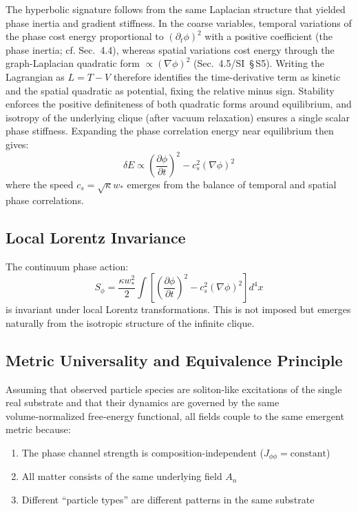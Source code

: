 \documentclass[11pt]{article}
\begin{document}
The hyperbolic signature follows from the same Laplacian structure that yielded phase inertia and gradient stiffness. In the coarse variables, temporal variations of the phase cost energy proportional to $(\partial_t\phi)^2$ with a positive coefficient (the phase inertia; cf. Sec.~4.4), whereas spatial variations cost energy through the graph-Laplacian quadratic form $\propto (\nabla\phi)^2$ (Sec.~4.5/SI~\S\,S5). Writing the Lagrangian as $L=T-V$ therefore identifies the time-derivative term as kinetic and the spatial quadratic as potential, fixing the relative minus sign. Stability enforces the positive definiteness of both quadratic forms around equilibrium, and isotropy of the underlying clique (after vacuum relaxation) ensures a single scalar phase stiffness. Expanding the phase correlation energy near equilibrium then gives:
\begin{equation}
\delta E \propto \left(\frac{\partial\phi}{\partial t}\right)^2 - c_s^2(\nabla\phi)^2
\end{equation}
where the speed $c_s = \sqrt{\kappa}w_*$ emerges from the balance of temporal and spatial phase correlations.

\subsection{Local Lorentz Invariance}

The continuum phase action:
\begin{equation}
S_\phi = \frac{\kappa w_*^2}{2} \int \left[\left(\frac{\partial\phi}{\partial t}\right)^2 - c_s^2(\nabla\phi)^2\right] d^4x
\end{equation}
is invariant under local Lorentz transformations. This is not imposed but emerges naturally from the isotropic structure of the infinite clique.

\subsection{Metric Universality and Equivalence Principle}

Assuming that observed particle species are soliton‑like excitations of the single real substrate and that their dynamics are governed by the same volume‑normalized free‑energy functional, all fields couple to the same emergent metric because:
\begin{enumerate}
\item The phase channel strength is composition-independent ($J_{\phi\phi} = \text{constant}$)
\item All matter consists of the same underlying field $A_n$
\item Different ``particle types'' are different patterns in the same substrate
\end{enumerate}
\end{document}
